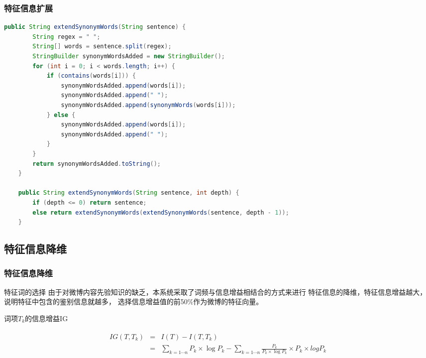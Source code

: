\documentclass[CJKutf8, table, handout]{beamer}
\begin{document}
\begin{CJK}{UTF8}{gbsn}
\begin{frame}[fragile]
  \frametitle{特征信息扩展}
  \lstset{language=Java,basicstyle=\ttfamily,commentstyle=\ttfamily}
  \begin{tiny}
    \begin{block}{}
      \begin{lstlisting}[language=Java]
    public String extendSynonymWords(String sentence) {
        String regex = " ";
        String[] words = sentence.split(regex);
        StringBuilder synonymWordsAdded = new StringBuilder();
        for (int i = 0; i < words.length; i++) {
            if (contains(words[i])) {
                synonymWordsAdded.append(words[i]);
                synonymWordsAdded.append(" ");
                synonymWordsAdded.append(synonymWords(words[i]));
            } else {
                synonymWordsAdded.append(words[i]);
                synonymWordsAdded.append(" ");
            }
        }
        return synonymWordsAdded.toString();
    }
    
    public String extendSynonymWords(String sentence, int depth) {
        if (depth <= 0) return sentence;
        else return extendSynonymWords(extendSynonymWords(sentence, depth - 1));
    }
      \end{lstlisting}
    \end{block}
  \end{tiny}
\end{frame}

\subsection{特征信息降维}
\begin{frame}
  \frametitle{特征信息降维}
  \begin{block}{特征词的选择}
    由于对微博内容先验知识的缺乏，本系统采取了词频与信息增益相结合的方式来进行
    特征信息的降维，特征信息增益越大，说明特征中包含的鉴别信息就越多，
    选择信息增益值的前50\%作为微博的特征向量。
  \end{block}

  \pause
  \begin{block}{词项$T_k$的信息增益IG}
    \pause
    \begin{small}
    \begin{eqnarray*}
      \begin{array}{crl}
        IG(T, T_k) &=&I(T) - I(T, T_k)\\
        &=& \sum_{k = 1 \cdots n}P_k \times \log P_k -
        \sum_{k = 1 \cdots n} \frac{P_k}{P_k \times \log P_k} \times P_k \times log P_k\\
      \end{array}
    \end{eqnarray*}
    \end{small}
  \end{block}
 

\end{frame}
\end{CJK}
\end{document}
